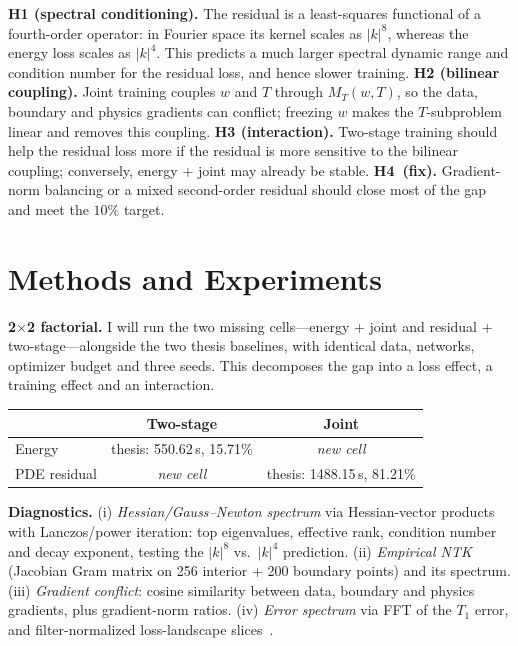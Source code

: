 \documentclass[10pt]{article}
\begin{document}
\textbf{H1 (spectral conditioning).} The residual is a least-squares functional of a fourth-order operator: in Fourier space its kernel scales as $|k|^8$, whereas the energy loss scales as $|k|^4$. This predicts a much larger spectral dynamic range and condition number for the residual loss, and hence slower training. \textbf{H2 (bilinear coupling).} Joint training couples $w$ and $T$ through $M_T(w,T)$, so the data, boundary and physics gradients can conflict; freezing $w$ makes the $T$-subproblem linear and removes this coupling. \textbf{H3 (interaction).} Two-stage training should help the residual loss more if the residual is more sensitive to the bilinear coupling; conversely, energy + joint may already be stable. \textbf{H4~(fix).} Gradient-norm balancing or a mixed second-order residual should close most of the gap and meet the $10\%$ target.

\section{Methods and Experiments}

\textbf{2$\times$2 factorial.} I will run the two missing cells---energy + joint and residual + two-stage---alongside the two thesis baselines, with identical data, networks, optimizer budget and three seeds. This decomposes the gap into a loss effect, a training effect and an interaction.
\enlargethispage{2\baselineskip}
\begin{center}
\vspace{-5pt}
\begin{tabular}{lcc}
\toprule
 & Two-stage & Joint \\
\midrule
Energy & thesis: 550.62\,s, 15.71\% & \emph{new cell} \\
PDE residual & \emph{new cell} & thesis: 1488.15\,s, 81.21\% \\
\bottomrule
\end{tabular}
\vspace{-2pt}
\end{center}

\textbf{Diagnostics.} (i) \emph{Hessian/Gauss--Newton spectrum} via Hessian-vector products with Lanczos/power iteration: top eigenvalues, effective rank, condition number and decay exponent, testing the $|k|^8$ vs.\ $|k|^4$ prediction. (ii) \emph{Empirical NTK} (Jacobian Gram matrix on 256 interior + 200 boundary points) and its spectrum. (iii) \emph{Gradient conflict}: cosine similarity between data, boundary and physics gradients, plus gradient-norm ratios. (iv) \emph{Error spectrum} via FFT of the $T_1$ error, and filter-normalized loss-landscape slices~\cite{li2018landscape}.
\end{document}
